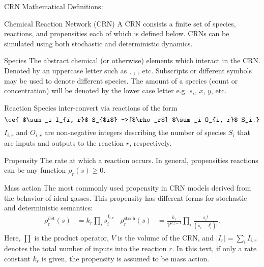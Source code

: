 \begin{breakout}[label=box:crn:definitions]{CRN Mathematical Definitions:}

  \begin{definition}{Chemical Reaction Network (CRN)}
    A CRN consists a finite set of species, reactions, and propensities each of which is defined below.
    CRNs can be simulated using both stochastic and deterministic dynamics.
  \end{definition}
  
  \begin{definition}{Species}
    The abstract chemical (or otherwise) elements which interact in the CRN.
    Denoted by an uppercase letter such as , , , etc.
    Subscripts or different symbols may be used to denote different species.
    The amount of a species (count or concentration) will be denoted by the lower case letter e.g. $s_i$, $x$, $y$, etc. 
  \end{definition}

  \begin{definition}{Reaction}
    Species inter-convert via reactions of the form
      \begin{equation*}
        \ce{ $\sum_i I_{i, r}$ S_{$i$} ->[$\rho_r$] $\sum_i O_{i, r}$ S_i.}
      \end{equation*}
    $I_{i, r}$ and $O_{i, r}$ are non-negative integers describing the number of species $S_i$ that are inputs and outputs to the reaction $r$, respectively.
  \end{definition}
    
  \begin{definition}{Propensity}
    The rate at which a reaction occurs.
    In general, propensities reactions can be any function $\rho_r(s) \geq 0$.
  \end{definition}
    
  \begin{definition}{Mass action}
    The most commonly used propensity in CRN models derived from the behavior of ideal gasses.
    This propensity has different forms for stochastic and deterministic semantics:
    \begin{align}
      \label{eq:crn:massaction-propensity}
      \rho^{\textrm{det}}_r(s) &= k_r \prod_i s_i^{I_{i, r}} &
      \rho^{\textrm{stoch}}_r(s) &=
        \frac{k_r}{V^{|I_r|-1}}
        \prod_i \frac{s_i!}{(s_i - I_r^i)!}.
    \end{align}
    Here, $\prod$ is the product operator, $V$ is the volume of the CRN, and $|I_r| = \sum_i I_{i, r}$ denotes the total number of inputs into the reaction $r$.
    In this text, if only a rate constant $k_r$ is given, the propensity is assumed to be mass action.
  \end{definition}
    

\end{breakout}
